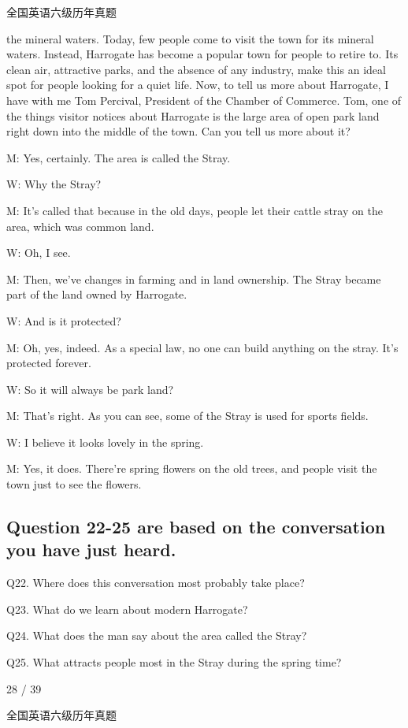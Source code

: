 \documentclass[UTF8,11pt]{ctexart}
\begin{document}
全国英语六级历年真题


the mineral waters. Today, few people come to visit the town for its mineral waters. Instead, Harrogate has become a popular town for people to retire to. Its clean air, attractive parks, and the absence of any industry, make this an ideal spot for people looking for a quiet life. Now, to tell us more about Harrogate, I have with me Tom Percival, President of the Chamber of Commerce. Tom, one of the things visitor notices about Harrogate is the large area of open park land right down into the middle of the town. Can you tell us more about it?


M: Yes, certainly. The area is called the Stray.


W: Why the Stray?


M: It’s called that because in the old days, people let their cattle stray on the area, which was common land.


W: Oh, I see.


M: Then, we’ve changes in farming and in land ownership. The Stray became part of the land owned by Harrogate.


W: And is it protected?


M: Oh, yes, indeed. As a special law, no one can build anything on the stray. It’s protected forever.


W: So it will always be park land?


M: That’s right. As you can see, some of the Stray is used for sports fields.


W: I believe it looks lovely in the spring.


M: Yes, it does. There’re spring flowers on the old trees, and people visit the town just to see the flowers.


\subsection*{Question 22-25 are based on the conversation you have just heard.}


Q22. Where does this conversation most probably take place?


Q23. What do we learn about modern Harrogate?


Q24. What does the man say about the area called the Stray?


Q25. What attracts people most in the Stray during the spring time?


28 / 39


全国英语六级历年真题
\end{document}
